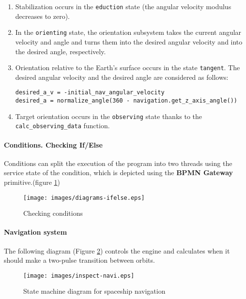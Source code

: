 \documentclass[12pt,a4paper]{article}
\begin{document}
\begin{enumerate}
\item Stabilization occurs in the \verb'eduction' state (the angular velocity modulus decreases to zero).

\item In the \verb'orienting' state, the orientation subsystem takes the current angular velocity and angle and turns them into the desired angular velocity and into the desired angle, respectively.

\item Orientation relative to the Earth's surface occurs in the state \verb'tangent'. The desired angular velocity and the desired angle are considered as follows:
\begin{verbatim}
desired_a_v = -initial_nav_angular_velocity
desired_a = normalize_angle(360 - navigation.get_z_axis_angle())
\end{verbatim}
\item Target orientation occurs in the \verb'observing' state thanks to the \verb'calc_observing_data' function.
\end{enumerate}

\clearpage

\paragraph{Conditions. Checking If/Else} Conditions can split the execution of the program into two threads using the service state of the condition, which is depicted using the \textbf{BPMN Gateway} primitive.(figure \ref{Pic:IfElse})

\begin{figure}[tbh]
  \begin{center}
    \texttt{[image: images/diagrams-ifelse.eps]}
    \caption{Checking conditions}
    \label{Pic:IfElse}
  \end{center}
\end{figure}

\paragraph{Navigation system} The following diagram (Figure \ref{Pic:INSPECT-navi-en}) controls the engine and calculates when it should make a two-pulse transition between orbits.

\begin{figure}[tbh]
  \begin{center}
    \texttt{[image: images/inspect-navi.eps]}
    \caption{State machine diagram for spaceship navigation}
    \label{Pic:INSPECT-navi-en}
  \end{center}
\end{figure}
\end{document}
